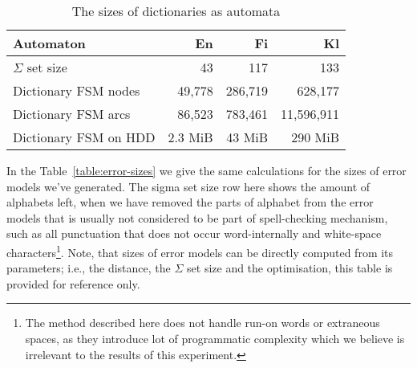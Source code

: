 \documentclass[11pt]{article}
\begin{document}
\begin{table}[h]
\begin{center}
\begin{scriptsize}
\begin{tabular}{|l|rrr|}
\hline
\bf Automaton & \bf En & \bf Fi & \bf Kl  \\ 
\hline
$\Sigma$ set size &
 43& 117& 133
\\
Dictionary FSM nodes &
 49,778& 286,719& 628,177
\\
Dictionary FSM arcs &
 86,523& 783,461& 11,596,911
\\
Dictionary FSM on HDD & 
2.3 MiB &
43 MiB &
290 MiB
\\
\hline
\end{tabular}
\end{scriptsize}
\end{center}
\caption{\label{table:dictionary-sizes}
The sizes of dictionaries as automata}
\end{table}

In the Table~\ref{table:error-sizes} we give the same calculations for the
sizes of error models we've generated. The sigma set size row here shows the
amount of alphabets left, when we have removed the parts of alphabet from the
error models that is usually not considered to be part of spell-checking
mechanism, such as all punctuation that does not occur word-internally and
white-space characters\footnote{The method described here does not handle
run-on words or extraneous spaces, as they introduce lot of programmatic
complexity which we believe is irrelevant to the results of this experiment.}.
Note, that sizes of error models can be directly computed from its parameters;
i.e., the distance, the $\Sigma$ set size and the optimisation, this table
is provided for reference only.
\end{document}
